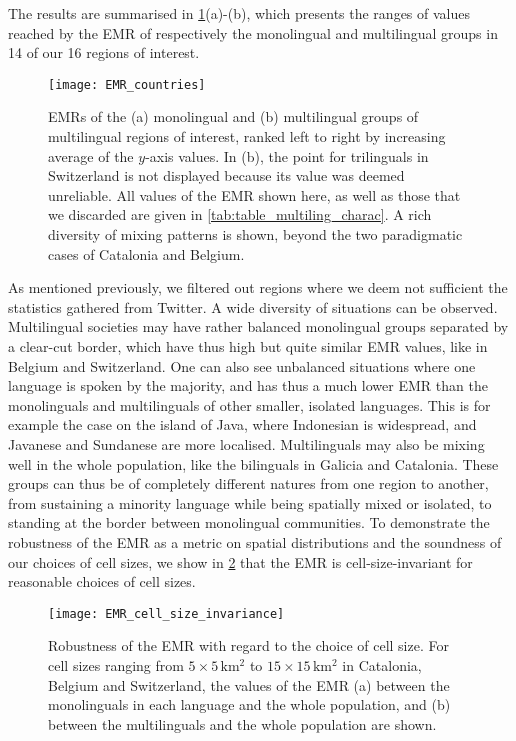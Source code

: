 \documentclass[../thesis.tex]{subfiles}
\begin{document}
The results are summarised in \cref{fig:EMR_countries}(a)-(b), which presents the ranges
of values reached by the \ac{EMR} of respectively the monolingual and multilingual
groups in 14 of our 16 regions of interest.
\begin{figure}[b!]
  \centering
  \texttt{[image: EMR\_countries]}
  \caption{\acp{EMR} of the (a) monolingual and (b) multilingual groups of multilingual
  regions of interest, ranked left to right by increasing average of the $y$-axis
  values. In (b), the point for trilinguals in Switzerland is not displayed because its
  value was deemed unreliable. All values of the \ac{EMR} shown here, as well as those
  that we discarded are given in \cref{tab:table_multiling_charac}. A rich diversity of
  mixing patterns is shown, beyond the two paradigmatic cases of Catalonia and Belgium.}
  \label{fig:EMR_countries}
\end{figure}
As mentioned previously, we filtered out regions where we deem not sufficient the
statistics gathered from Twitter. A wide diversity of situations can be observed.
Multilingual societies may have rather balanced monolingual groups separated by a
clear-cut border, which have thus high but quite similar \ac{EMR} values, like in
Belgium and Switzerland. One can also see unbalanced situations where one language is
spoken by the majority, and has thus a much lower \ac{EMR} than the monolinguals and
multilinguals of other smaller, isolated languages. This is for example the case on the
island of Java, where Indonesian is widespread, and Javanese and Sundanese are more
localised. Multilinguals may also be mixing well in the whole population, like the
bilinguals in Galicia and Catalonia. These groups can thus be of completely different
natures from one region to another, from sustaining a minority language while being
spatially mixed or isolated, to standing at the border between monolingual communities.
To demonstrate the robustness of the \ac{EMR} as a metric on spatial distributions and
the soundness of our choices of cell sizes, we show in
\cref{fig:EMR_cell_size_invariance} that the \ac{EMR} is cell-size-invariant for
reasonable choices of cell sizes.
\begin{figure}[h!]
  \centering
  \texttt{[image: EMR\_cell\_size\_invariance]}
  \caption{Robustness of the \ac{EMR} with regard to the choice of cell size. For cell
  sizes ranging from $5 \times 5 \, \si{\kilo \meter \squared}$ to $15 \times 15 \,
  \si{\kilo \meter \squared}$ in Catalonia, Belgium and Switzerland, the values of the
  \ac{EMR} (a) between the monolinguals in each language and the whole population, and
  (b) between the multilinguals and the whole population are shown.}
  \label{fig:EMR_cell_size_invariance}
\end{figure}
\end{document}
